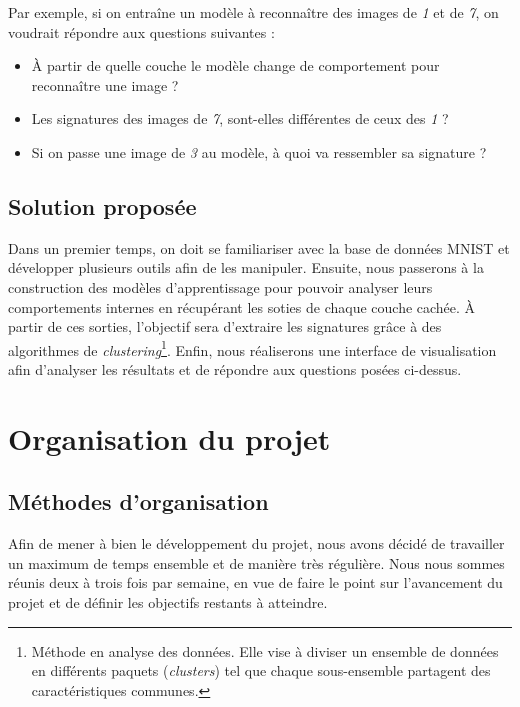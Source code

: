 \documentclass[oneside,13pt,a4paper]{report}
\begin{document}
Par exemple, si on entraîne un modèle à reconnaître des images de \textit{1} et de \textit{7}, on voudrait répondre aux questions suivantes :

\begin{itemize}
	\item À partir de quelle couche le modèle change de comportement pour reconnaître une image ?
	\item Les signatures des images de \textit{7}, sont-elles différentes de ceux des \textit{1} ?
	\item Si on passe une image de \textit{3} au modèle, à quoi va ressembler sa signature ?
\end{itemize}

\section{Solution proposée}

Dans un premier temps, on doit se familiariser avec la base de données MNIST et développer plusieurs outils afin de les manipuler. Ensuite, nous passerons à la construction des modèles d'apprentissage pour pouvoir analyser leurs comportements internes en récupérant les soties de chaque couche cachée. À partir de ces sorties, l'objectif sera d'extraire les signatures grâce à des algorithmes de \textit{clustering}\footnote{Méthode en analyse des données. Elle vise à diviser un ensemble de données en différents paquets (\textit{clusters}) tel que chaque sous-ensemble partagent des caractéristiques communes.}. Enfin, nous réaliserons une interface de visualisation afin d'analyser les résultats et de répondre aux questions posées ci-dessus.


\chapter{Organisation du projet}
\section{Méthodes d’organisation}

Afin de mener à bien le développement du projet, nous avons décidé de travailler un maximum de temps ensemble et de manière très régulière. Nous nous sommes réunis deux à trois fois par semaine, en vue de faire le point sur l'avancement du projet et de définir les objectifs restants à atteindre.
\end{document}

